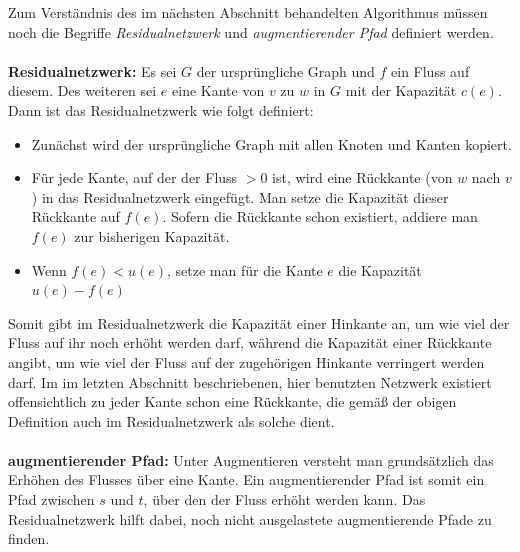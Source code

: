 \documentclass[a4paper, notitlepage, 12pt]{scrartcl}
\begin{document}
Zum Verständnis des im nächsten Abschnitt behandelten Algorithmus müssen noch die Begriffe \textit{Residualnetzwerk} und \textit{augmentierender Pfad} definiert werden.
\\ \\
\textbf{Residualnetzwerk:} Es sei $G$ der ursprüngliche Graph und $f$ ein Fluss auf diesem. Des weiteren sei $e$ eine Kante von $v$ zu $w$  in $G$ mit der Kapazität $c(e)$. Dann ist das Residualnetzwerk wie folgt definiert:
\begin{itemize}
\item Zunächst wird der ursprüngliche Graph mit allen Knoten und Kanten kopiert.
\item Für jede Kante, auf der der Fluss $> 0$ ist, wird eine Rückkante (von $w$ nach $v$) in das Residualnetzwerk eingefügt. Man setze die Kapazität dieser Rückkante auf $f(e)$. Sofern die Rückkante schon existiert, addiere man $f(e)$ zur bisherigen Kapazität.
\item Wenn $f(e) < u(e)$, setze man für die Kante $e$ die Kapazität $u(e) - f(e)$
\end{itemize}
Somit gibt im Residualnetzwerk die Kapazität einer Hinkante an, um wie viel der Fluss auf ihr noch erhöht werden darf, während die Kapazität einer Rückkante angibt, um wie viel der Fluss auf der zugehörigen Hinkante verringert werden darf. Im im letzten Abschnitt beschriebenen, hier benutzten Netzwerk existiert offensichtlich zu jeder Kante schon eine Rückkante, die gemäß der obigen Definition auch im Residualnetzwerk als solche dient.
\\ \\
\textbf{augmentierender Pfad:} Unter Augmentieren versteht man grundsätzlich das Erhöhen des Flusses über eine Kante. Ein augmentierender Pfad ist somit ein Pfad zwischen $s$ und $t$, über den der Fluss erhöht werden kann. Das Residualnetzwerk hilft dabei, noch nicht ausgelastete augmentierende Pfade zu finden.
\end{document}
